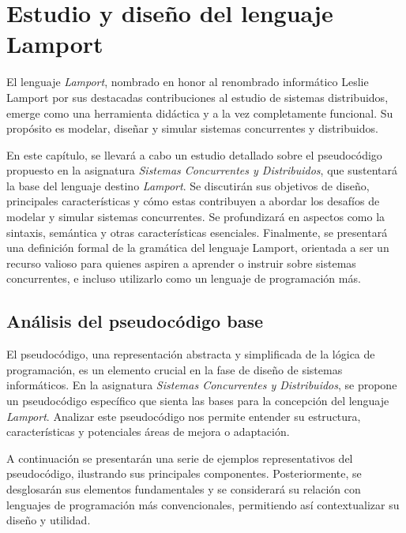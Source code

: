 \chapter{Estudio y diseño del lenguaje Lamport}
El lenguaje \textit{Lamport}, nombrado en honor al renombrado informático Leslie Lamport por sus destacadas contribuciones al estudio de sistemas distribuidos, emerge como una herramienta didáctica y a la vez completamente funcional. Su propósito es modelar, diseñar y simular sistemas concurrentes y distribuidos.

\vspace{0.5cm}

En este capítulo, se llevará a cabo un estudio detallado sobre el pseudocódigo propuesto en la asignatura \textit{Sistemas Concurrentes y Distribuidos}, que sustentará la base del lenguaje destino \textit{Lamport}. Se discutirán sus objetivos de diseño, principales características y cómo estas contribuyen a abordar los desafíos de modelar y simular sistemas concurrentes. Se profundizará en aspectos como la sintaxis, semántica y otras características esenciales. Finalmente, se presentará una definición formal de la gramática del lenguaje Lamport, orientada a ser un recurso valioso para quienes aspiren a aprender o instruir sobre sistemas concurrentes, e incluso utilizarlo como un lenguaje de programación más.

\section{Análisis del pseudocódigo base}\label{sec:pseudoAnalisis}
El pseudocódigo, una representación abstracta y simplificada de la lógica de programación, es un elemento crucial en la fase de diseño de sistemas informáticos. En la asignatura \textit{Sistemas Concurrentes y Distribuidos}, se propone un pseudocódigo específico que sienta las bases para la concepción del lenguaje \textit{Lamport}. Analizar este pseudocódigo nos permite entender su estructura, características y potenciales áreas de mejora o adaptación.

\vspace{0.5cm}

A continuación se presentarán una serie de ejemplos representativos del pseudocódigo, ilustrando sus principales componentes. Posteriormente, se desglosarán sus elementos fundamentales y se considerará su relación con lenguajes de programación más convencionales, permitiendo así contextualizar su diseño y utilidad.

\newpage


